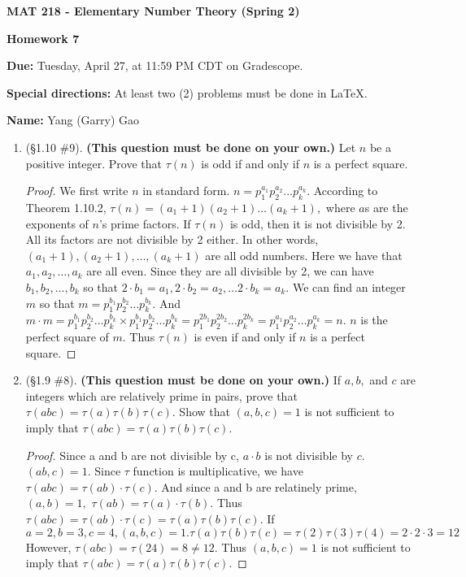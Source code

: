 \documentclass[11pt,a4paper]{article}
\begin{document}
\begin{Large}
\centerline{\bf MAT 218 - Elementary Number Theory (Spring 2)}\medskip
\centerline{\bf Homework 7}\medskip
\end{Large}
{\bf Due:} Tuesday, April 27, at 11:59 PM CDT on Gradescope.

{\bf Special directions:} At least two (2) problems must be done in \LaTeX.

{\bf Name:} Yang (Garry) Gao


\hrulefill

\begin{enumerate}

	\item (\S 1.10 \#9). \textbf{(This question must be done on your own.)} Let \(n\) be a positive integer. Prove that \(\tau(n)\) is odd if and only if \(n\) is a perfect square.

	\begin{proof}
		We first write $n$ in standard form. $n=p_1^{a_1}p_2^{a_2}\ldots p_k^{a_k}.$ According to Theorem 1.10.2, $\tau (n) = (a_1+1)(a_2+1)\ldots (a_k+1),$ where $a$s are the exponents of $n$'s prime factors. If $\tau (n)$ is odd, then it is not divisible by 2. All its factors are not divisible by 2 either. In other words, $(a_1+1),(a_2+1),\ldots ,(a_k+1)$ are all odd numbers. Here we have that $a_1, a_2, \ldots , a_k$ are all even. Since they are all divisible by 2, we can have $b_1, b_2, \ldots , b_k$ so that $2\cdot b_1 = a_1, 2\cdot b_2 = a_2, \ldots 2\cdot b_k = a_k.$ We can find an integer $m$ so that $m=p_1^{b_1}p_2^{b_2}\ldots p_k^{b_k}.$ And $m\cdot m =  p_1^{b_1}p_2^{b_2}\ldots p_k^{b_k} \times p_1^{b_1}p_2^{b_2}\ldots p_k^{b_k} = p_1^{2b_1}p_2^{2b_2}\ldots p_k^{2b_k} = p_1^{a_1}p_2^{a_2}\ldots p_k^{a_k} = n.$ $n$ is the perfect square of $m$. Thus $\tau (n)$ is even if and only if $n$ is a perfect square.
	\end{proof}

	\item (\S 1.9 \#8). \textbf{(This question must be done on your own.)} If \(a, b,\) and \(c\) are integers which are relatively prime in pairs, prove that \(\tau(abc) = \tau(a)\tau(b)\tau(c)\). Show that \((a,b,c)=1\) is not sufficient to imply that \(\tau(abc) = \tau(a)\tau(b)\tau(c)\).

	\begin{proof}
		Since a and b are not divisible by c, $a\cdot b$ is not divisible by $c.$ $(ab, c) = 1.$ Since $\tau$ function is multiplicative, we have $\tau (abc) = \tau (ab) \cdot \tau(c).$ And since a and b are relatinely prime, $(a,b) = 1,$ $\tau (ab) = \tau (a) \cdot \tau (b).$ Thus $\tau (abc) = \tau (ab) \cdot \tau(c) = \tau(a)\tau(b)\tau(c).$ If $a=2, b=3, c=4, (a,b,c)=1. \tau(a)\tau(b)\tau(c) = \tau(2)\tau(3)\tau(4) = 2 \cdot 2 \cdot 3 = 12$ However, $\tau (abc) = \tau (24) = 8 \ne 12.$ Thus \((a,b,c)=1\) is not sufficient to imply that \(\tau(abc) = \tau(a)\tau(b)\tau(c)\).
	\end{proof}



\end{enumerate}
\end{document}
